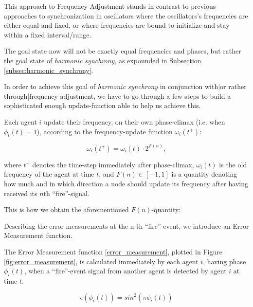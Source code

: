 			This approach to Frequency Adjustment stands in contrast to previous approaches to synchronization in oscillators  where the oscillators's frequencies are either equal and fixed, or where frequencies are bound to initialize and stay within a fixed interval/range.
			
			The goal state now will not be exactly equal frequencies and phases, but rather the goal state of \textit{harmonic synchrony}, as expounded in Subsection \ref{subsec:harmonic_synchrony}.
			
			In order to achieve this goal of \textit{harmonic synchrony} in conjunction with|or rather through|frequency adjustment, we have to go through a few steps to build a sophisticated enough update-function able to help us achieve this.
			
			Each agent $i$ update their frequency, on their own phase-climax (i.e. when $\phi_i(t)=1$), according to the frequency-update function $\omega_i(t^+)$:
			
			\begin{equation}
				\omega_i(t^+) = \omega_i(t) \cdot 2^{F(n)},
			\end{equation}
			
			where $t^+$ denotes the time-step immediately after phase-climax, $\omega_i(t)$ is the old frequency of the agent at time $t$, and $F(n) \in [-1,1]$ is a quantity denoting how much and in which direction a node should update its frequency after having received its $n$th ``fire''-signal.
			
			This is how we obtain the aforementioned $F(n)$-quantity:
			
			
			
			Describing the error measurements at the n-th ``fire''-event, we introduce an Error Measurement function.
			
			The Error Measurement function \eqref{error_measurement}, plotted in Figure \ref{fig:error_measurement}, is calculated immediately by each agent $i$, having phase $\phi_i(t)$, when a ``fire''-event signal from another agent is detected by agent $i$ at time $t$.
			
			\begin{equation}
			\label{error_measurement}
				\epsilon(\phi_i(t)) = sin^2(\pi\phi_i(t))
			\end{equation} \nl
			
